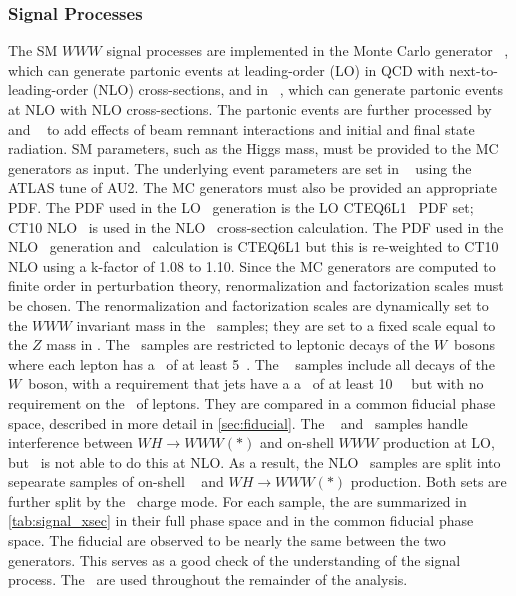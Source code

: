 \subsubsection{Signal Processes}
\label{sec:signal}



The SM $WWW$ signal processes are implemented in the Monte
Carlo generator \vbfnlo~\cite{Arnold:2011wj,Arnold:2012xn},
which can generate partonic events at leading-order (LO) in QCD with
next-to-leading-order (NLO) cross-sections, 
and in \madgraph~\cite{MadGraph}, which can generate
partonic events at NLO  with NLO cross-sections. 
The partonic events are further processed 
by \pythiaeight~\cite{Sjostrand:2007gs} and \photos~\cite{Golonka:2005pn} 
to add effects of beam remnant interactions and initial and 
final state radiation. 
SM parameters, such as the Higgs mass,
must be provided to the MC generators as input. 
The underlying event
parameters are set in \pythiaeight~ using the ATLAS tune 
of AU2\cite{atlas:2011zja}.
The MC generators must also be provided an appropriate PDF.
The PDF used  in the LO \vbfnlo~generation is
the LO CTEQ6L1~\cite{Pumplin:2002vw} PDF set;
CT10 NLO~\cite{guzzi:2011sv}
is used in the NLO \vbfnlo~cross-section calculation.
The PDF used in the NLO \madgraph~generation 
and \xsec~calculation is CTEQ6L1 
but this is re-weighted to CT10 NLO using a k-factor of 1.08 to 1.10.
Since the MC generators are computed to finite order in perturbation
theory, renormalization and factorization scales must be chosen.
The renormalization and factorization scales are dynamically
set to the $WWW$ invariant mass in the \vbfnlo~samples; they 
are set to a fixed scale equal to the $Z$ mass in \madgraph.
The \vbfnlo~samples are restricted to leptonic decays of the $W$~bosons
where each lepton has a \pt~of at least 5~\GeV. The \madgraph~
samples include all decays of the $W$~boson, with a requirement 
that jets have a a \pt~of at least 10~\GeV~ but with no requirement
on the \pt~of leptons.
They are compared in a common fiducial phase space,
described in more detail in \sec\ref{sec:fiducial}.
The \vbfnlo~ and \madgraph~samples handle interference 
between $WH\rightarrow WWW(*)$ 
and on-shell $WWW$ production at LO, but \madgraph~is not
able to do this at NLO. As a result, the NLO \madgraph~samples
are split into sepearate samples of 
on-shell \www~ and $WH\rightarrow WWW(*)$ production.
Both sets are further split by the \www~charge mode.
For each sample, the \xsecs are summarized in \tab\ref{tab:signal_xsec} 
in their full phase space and in the common fiducial phase space.
The fiducial \xsecs are observed to be nearly the same
between the two generators.
This serves as a good check of the understanding of the 
signal process. The \madgraph~\xsecs are used throughout the 
remainder of the analysis.

